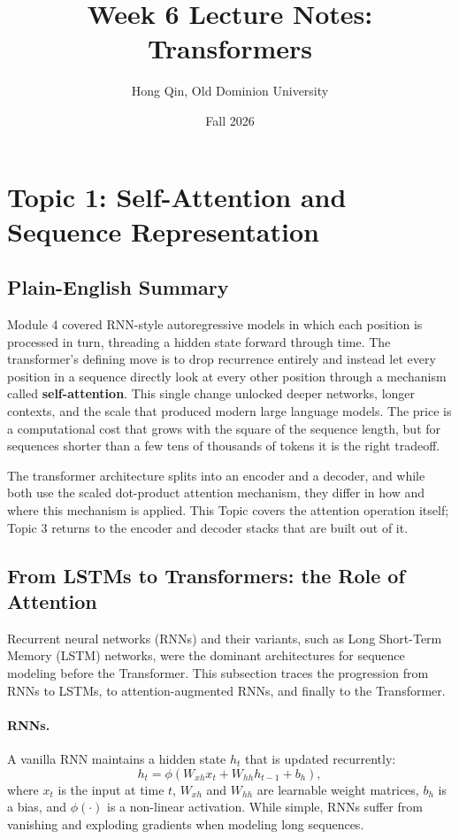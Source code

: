 \documentclass[11pt]{article}
\title{Week 6 Lecture Notes: Transformers}
\author{Hong Qin, Old Dominion University}
\date{Fall 2026}
\theoremstyle{remark}
\begin{document}
\maketitle
\tableofcontents
\newpage

%
\section{Topic 1: Self-Attention and Sequence Representation}
%

\subsection{Plain-English Summary}

Module 4 covered RNN-style autoregressive models in which each position is processed in turn, threading a hidden state forward through time. The transformer's defining move is to drop recurrence entirely and instead let every position in a sequence directly look at every other position through a mechanism called \textbf{self-attention}. This single change unlocked deeper networks, longer contexts, and the scale that produced modern large language models. The price is a computational cost that grows with the square of the sequence length, but for sequences shorter than a few tens of thousands of tokens it is the right tradeoff.

The transformer architecture splits into an encoder and a decoder, and while both use the scaled dot-product attention mechanism, they differ in how and where this mechanism is applied. This Topic covers the attention operation itself; Topic 3 returns to the encoder and decoder stacks that are built out of it.

\subsection{From LSTMs to Transformers: the Role of Attention}

Recurrent neural networks (RNNs) and their variants, such as Long Short-Term Memory (LSTM) networks, were the dominant architectures for sequence modeling before the Transformer. This subsection traces the progression from RNNs to LSTMs, to attention-augmented RNNs, and finally to the Transformer.

\paragraph{RNNs.}
A vanilla RNN maintains a hidden state $h_t$ that is updated recurrently:
\begin{equation}
    h_t = \phi(W_{xh} x_t + W_{hh} h_{t-1} + b_h),
\end{equation}
where $x_t$ is the input at time $t$, $W_{xh}$ and $W_{hh}$ are learnable weight matrices, $b_h$ is a bias, and $\phi(\cdot)$ is a non-linear activation.
While simple, RNNs suffer from vanishing and exploding gradients when modeling long sequences.
\end{document}
